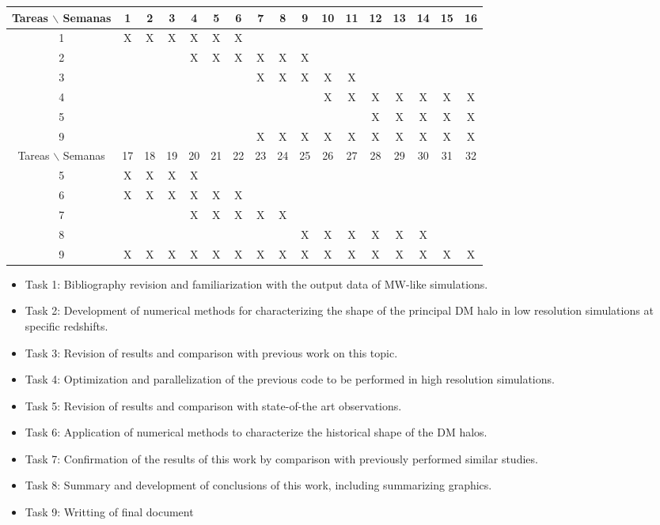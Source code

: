 \documentclass[12pt]{article}
\begin{document}
\begin{table}[htb]
	\begin{tabular}{|c|cccccccccccccccc| }
	\hline
	Tareas $\backslash$ Semanas & 1 & 2 & 3 & 4 & 5 & 6 & 7 & 8 & 9 & 10 & 11 & 12 & 13 & 14 & 15 & 16  \\
	\hline
	1 & X & X & X & X & X & X &   &   &   &   &   &   &   &   &   &   \\
	2 &   &   &   & X & X & X & X & X & X &   &   &   &   &   &   &   \\
	3 &   &   &   &   &   &   & X & X & X & X & X &   &   &   &   &   \\
	4 &   &   &   &   &   &   &   &   &   & X & X & X & X & X & X & X \\
	5 &   &   &   &   &   &   &   &   &   &   &   & X & X & X & X & X \\
	9 &   &   &   &   &   &   & X & X & X & X & X & X & X & X & X & X \\

	\hline
	Tareas $\backslash$ Semanas & 17 & 18 & 19 & 20 & 21 & 22 & 23 & 24 & 25 & 26 & 27 & 28 & 29 & 30 & 31 & 32  \\
	\hline
	5 & X & X & X & X &   &   &   &   &   &   &   &   &   &   &   &   \\
	6 & X & X & X & X & X & X &   &   &   &   &   &   &   &   &   &   \\
	7 &   &   &   & X & X & X & X & X &   &   &   &   &   &   &   &   \\
	8 &   &   &   &   &   &   &   &   & X & X & X & X & X & X &   &   \\
	9 & X & X & X & X & X & X & X & X & X & X & X & X & X & X & X & X \\


	\hline
	\end{tabular}
\end{table}
\vspace{1mm}

\begin{itemize}
	\item Task 1: Bibliography revision and familiarization with the output data of MW-like simulations.
	\item Task 2: Development of numerical methods for characterizing the shape of the principal DM halo in low resolution simulations at specific redshifts.
	\item Task 3: Revision of results and comparison with  previous work on this topic.
	\item Task 4: Optimization and parallelization of the previous code to be performed in high resolution simulations.
	\item Task 5: Revision of results and comparison with state-of-the art observations.
	\item Task 6: Application of numerical methods to characterize the historical shape of the DM halos.
	\item Task 7: Confirmation of the results of this work by comparison with previously performed similar studies.
	\item Task 8: Summary and development of conclusions of this work, including summarizing graphics.
	\item Task 9: Writting of final document
\end{itemize}
\end{document}
